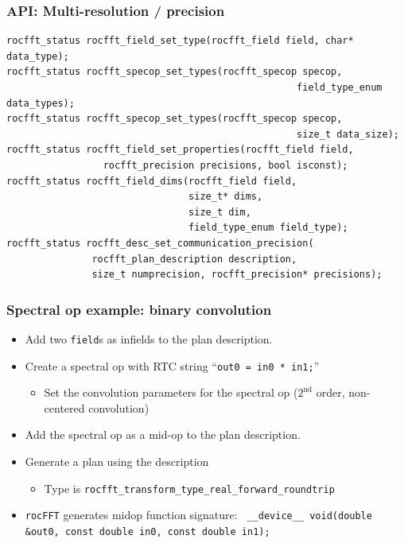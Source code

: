 \documentclass[10pt,aspectratio=169]{beamer}
\begin{document}
\begin{frame}[fragile]
  \frametitle{API: Multi-resolution / precision}

  \begin{lstlisting}
rocfft_status rocfft_field_set_type(rocfft_field field, char* data_type);
rocfft_status rocfft_specop_set_types(rocfft_specop specop,
                                                   field_type_enum data_types);
rocfft_status rocfft_specop_set_types(rocfft_specop specop,
                                                   size_t data_size);
rocfft_status rocfft_field_set_properties(rocfft_field field,
                 rocfft_precision precisions, bool isconst);
rocfft_status rocfft_field_dims(rocfft_field field,
                                size_t* dims,
                                size_t dim,
                                field_type_enum field_type);
rocfft_status rocfft_desc_set_communication_precision(
               rocfft_plan_description description,
               size_t numprecision, rocfft_precision* precisions);
\end{lstlisting}
  
\end{frame}


\begin{frame}[fragile]
  \frametitle{Spectral op example: binary convolution}

  \begin{itemize}
  \item Add two \texttt{field}s as infields to the plan description.

  \item Create a spectral op with RTC string ``\lstinline{out0 = in0 * in1;}''
    \begin{itemize}
    \item Set the convolution parameters for the spectral op ($2^{\text{nd}}$ order, non-centered convolution)
    \end{itemize}
  \item Add the spectral op as a mid-op to the plan description.
  \item Generate a plan using the description
    \begin{itemize}
    \item Type is \texttt{rocfft_transform_type_real_forward_roundtrip}
    \end{itemize}
  \item \texttt{rocFFT} generates midop function signature:
    \lstinline{ __device__ void(double &out0, const double in0, const double in1);}
  \end{itemize}
  
\end{frame}
\end{document}
